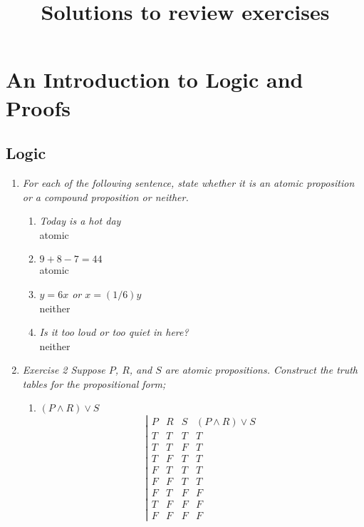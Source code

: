 \documentclass[10pt]{article}
\title{Solutions to review exercises}
\date{}
\begin{document}
\maketitle

\section{An Introduction to Logic and Proofs}

\subsection{Logic}
\renewcommand{\labelenumi}{\textbf{Exercise \arabic{enumi}}}
\renewcommand{\labelenumii}{\roman{enumii}}
\begin{enumerate}
\item \textit{For each of the following sentence, state whether it is an atomic
proposition or a compound proposition or neither.}
\begin{enumerate}
\item \textit{Today is a hot day} \\
  atomic
\item \textit{$9+8-7=44$} \\
  atomic
\item \textit{$y = 6x$ or $x = (1/6)y$} \\
  neither
\item \textit{Is it too loud or too quiet
    in here?} \\
  neither
\end{enumerate}
\item \textit{Exercise 2 Suppose $P$, $R$, and $S$ are atomic propositions. Construct the
truth tables for the propositional form;} 
\begin{enumerate}
  \item $(P \wedge R) \vee S$
    \[ \left\vert\begin{array}{cccc} 
        P & R & S & (P \wedge R) \vee S \\
        T & T & T & T \\
        T & T & F & T \\
        T & F & T & T \\
        F & T & T & T \\
        F & F & T & T \\
        F & T & F & F \\
        T & F & F & F \\
        F & F & F & F
      \end{array}
\]
\end{enumerate}
\end{enumerate}
\end{document}
